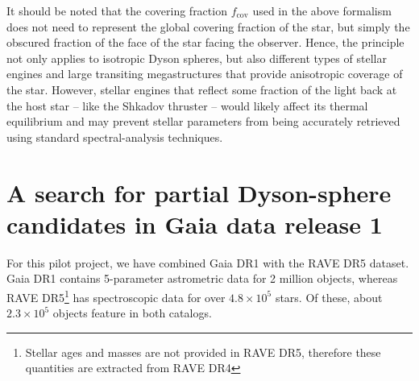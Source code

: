 \documentclass[twocolumn]{aastex6}
\begin{document}
It should be noted that the covering fraction $f_\mathrm{cov}$ used in the above formalism does not need to represent the global covering fraction of the star, but simply the obscured fraction of the face of the star facing the observer. Hence, the principle not only applies to isotropic Dyson spheres, but also different types of stellar engines \citep[e.g.][]{Badescu00} and large transiting megastructures \citep{Wright16} that provide anisotropic coverage of the star. However, stellar engines that reflect some fraction of the light back at the host star -- like the Shkadov thruster \citep{Shkadov87,Forgan13} -- would likely affect its thermal equilibrium and may prevent stellar parameters from being accurately retrieved using standard spectral-analysis techniques.

\section{A search for partial Dyson-sphere candidates in Gaia data release 1}
\label{DR1}
For this pilot project, we have combined Gaia DR1 with the RAVE DR5 dataset. Gaia DR1 contains 5-parameter astrometric data for 2 million objects, whereas RAVE DR5\footnote{Stellar ages and masses are not provided in RAVE DR5, therefore these quantities are extracted from RAVE DR4} has spectroscopic data for over $4.8\times 10^5$ stars. Of these, about $2.3 \times 10^5$ objects feature in both catalogs. 
\end{document}
